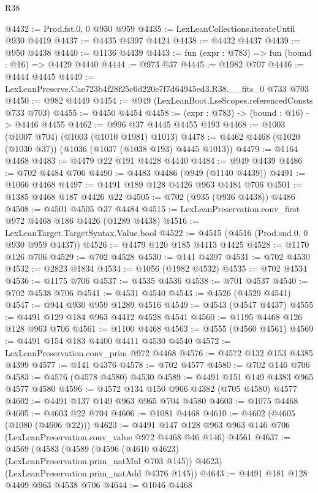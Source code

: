\begin{lexlean}{R38}
\begin{coremodule}
@4432 := Prod.fst.{0, 0} @930 @959
@4435 := LexLeanCollections.iterateUntil @930 @4419
@4437 := @4435 @4397 @4424
@4438 := @4432 @4437
@4439 := @950 @4438
@4440 := @1136 @4439
@4443 := fun (expr : @783) => fun (bound : @16) => @4429 @4440
@4444 := @973 @37
@4445 := @1982 @707
@4446 := @4444 @4445
@4449 := LexLeanPreserve.Cae723b4f28f25c6d220e7f7d64945ed3.R38.__fits_0 @733 @703
@4450 := @982 @4449
@4454 := @949 (LexLeanBoot.LseScopes.referencedConsts @733 @703)
@4455 := @4450 @4454
@4458 := (expr : @783) -> (bound : @16) -> @4446 @4455
@4462 := @996 @37 @4445 @4455 @193
@4468 := @1003 (@1007 @704) (@1003 (@1010 @1981) @1013)
@4478 := @4462 @4468 (@1020 (@1030 @37)) (@1036 (@1037 (@1038 @193) @4445 @1013))
@4479 := @1164 @4468
@4483 := @4479 @22 @191 @4428 @4440
@4484 := @949 @4439
@4486 := @702 @4484 @706
@4490 := @4483 @4486 (@949 (@1140 @4439))
@4491 := @1066 @4468
@4497 := @4491 @189 @128 @4426 @963 @4484 @706
@4501 := @1385 @4468 @187 @4426 @22
@4505 := @702 (@935 (@936 @4438)) @4486
@4508 := @4501 @4505 @37 @4484
@4515 := LexLeanPreservation.conv_first @972 @4468 @186 @4426 (@1289 @4438)
@4516 := LexLeanTarget.TargetSyntax.Value.bool
@4522 := @4515 (@4516 (Prod.snd.{0, 0} @930 @959 @4437))
@4526 := @4479 @120 @185 @4413 @4425
@4528 := @1170 @126 @706
@4529 := @702 @4528
@4530 := @141 @4397
@4531 := @702 @4530
@4532 := @2823 @1834
@4534 := @1056 (@1982 @4532)
@4535 := @702 @4534
@4536 := @1175 @706
@4537 := @4535 @4536
@4538 := @701 @4537
@4540 := @702 @4538 @706
@4541 := @4531 @4540
@4543 := @4526 (@4529 @4541)
@4547 := @944 @930 @959 @1289 @4516
@4549 := @4543 (@4547 @4437)
@4555 := @4491 @129 @184 @963 @4412 @4528 @4541
@4560 := @1195 @4468 @126 @128 @963 @706
@4561 := @1100 @4468
@4563 := @4555 (@4560 @4561)
@4569 := @4491 @154 @183 @4400 @4411 @4530 @4540
@4572 := LexLeanPreservation.conv_prim @972 @4468
@4576 := @4572 @132 @153 @4385 @4399
@4577 := @141 @4376
@4578 := @702 @4577
@4580 := @702 @146 @706
@4583 := @4576 (@4578 @4580) @4530
@4589 := @4491 @151 @149 @4383 @965 @4577 @4580
@4596 := @4572 @134 @150 @966 @4382 (@705 @4580) @4577
@4602 := @4491 @137 @149 @963 @965 @704 @4580
@4603 := @1075 @4468
@4605 := @4603 @22 @704
@4606 := @1081 @4468
@4610 := @4602 (@4605 (@1080 (@4606 @22)))
@4623 := @4491
    @147
    @128
    @963
    @963
    @146
    @706
    (LexLeanPreservation.conv_value @972 @4468 @46 @146)
    @4561
@4637 := @4569
    (@4583
      (@4589 (@4596 (@4610 @4623) (LexLeanPreservation.prim_natMul @703 @145)) @4623)
      (LexLeanPreservation.prim_natAdd @4376 @145))
@4643 := @4491 @181 @128 @4409 @963 @4538 @706
@4644 := @1046 @4468

\end{coremodule}
\end{lexlean}
